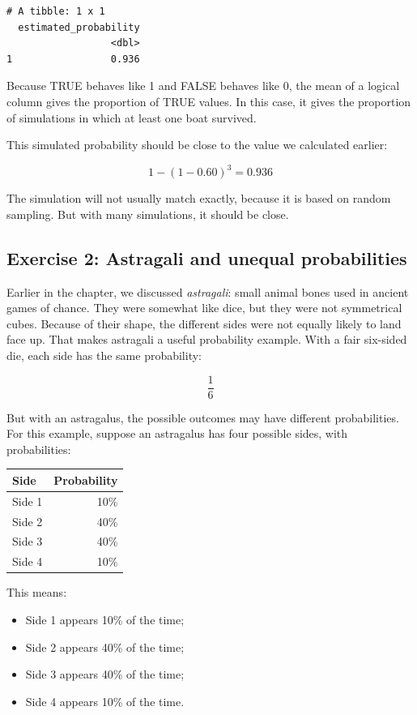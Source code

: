 \documentclass[
  letterpaper,
  DIV=11,
  numbers=noendperiod]{scrreprt}
\providecommand{\tightlist}{%
  \setlength{\itemsep}{0pt}\setlength{\parskip}{0pt}}
\begin{document}
\begin{verbatim}
# A tibble: 1 x 1
  estimated_probability
                  <dbl>
1                 0.936
\end{verbatim}

Because TRUE behaves like 1 and FALSE behaves like 0, the mean of a
logical column gives the proportion of TRUE values. In this case, it
gives the proportion of simulations in which at least one boat survived.

This simulated probability should be close to the value we calculated
earlier:

\[1-(1-0.60)^{3}=0.936\]

The simulation will not usually match exactly, because it is based on
random sampling. But with many simulations, it should be close.

\subsection{Exercise 2: Astragali and unequal
probabilities}\label{exercise-2-astragali-and-unequal-probabilities}

Earlier in the chapter, we discussed \emph{astragali}: small animal
bones used in ancient games of chance. They were somewhat like dice, but
they were not symmetrical cubes. Because of their shape, the different
sides were not equally likely to land face up. That makes astragali a
useful probability example. With a fair six-sided die, each side has the
same probability:

\[\frac{1}{6}\]

But with an astragalus, the possible outcomes may have different
probabilities. For this example, suppose an astragalus has four possible
sides, with probabilities:

\begin{table}
\fontsize{12.0pt}{14.0pt}\selectfont
\begin{tabular*}{\linewidth}{@{\extracolsep{\fill}}lr}
\toprule
Side & Probability \\ 
\midrule\addlinespace[2.5pt]
Side 1 & 10\% \\ 
Side 2 & 40\% \\ 
Side 3 & 40\% \\ 
Side 4 & 10\% \\ 
\bottomrule
\end{tabular*}
\end{table}

This means:

\begin{itemize}
\tightlist
\item
  Side 1 appears 10\% of the time;
\item
  Side 2 appears 40\% of the time;
\item
  Side 3 appears 40\% of the time;
\item
  Side 4 appears 10\% of the time.
\end{itemize}
\end{document}
